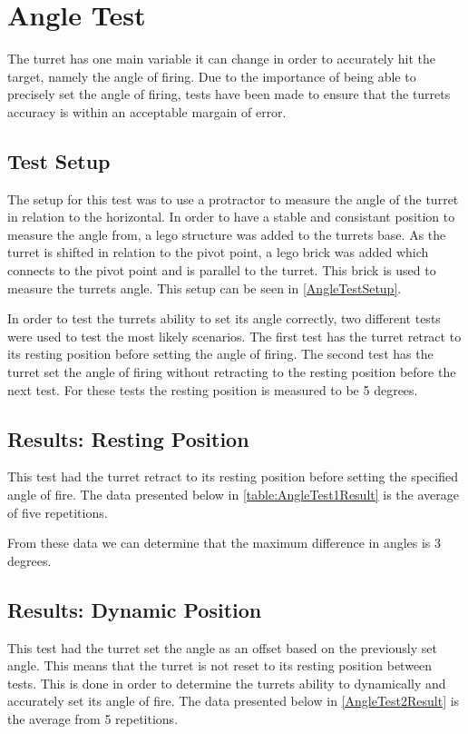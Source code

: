 \chapter{Angle Test}\label{angleTest}
The turret has one main variable it can change in order to accurately hit the
target, namely the angle of firing. Due to the importance of being able to
precisely set the angle of firing, tests have been made to ensure that the
turrets accuracy is within an acceptable margain of error.

\section{Test Setup}
The setup for this test was to use a protractor to measure the angle of the
turret in relation to the horizontal. In order to have a stable and
consistant position to measure the angle from, a lego structure was added to the
turrets base. As the turret is shifted in relation to the pivot point, a lego
brick was added which connects to the pivot point and is parallel to the turret.
This brick is used to measure the turrets angle. This setup can be seen in
\autoref{AngleTestSetup}.


In order to test the turrets ability to set its angle correctly, two different
tests were used to test the most likely scenarios. The first test has the turret
retract to its resting position before setting the angle of firing. The second
test has the turret set the angle of firing without retracting to the resting
position before the next test. For these tests the resting position is measured
to be 5 degrees.

\section{Results: Resting Position}
This test had the turret retract to its resting position before setting the
specified angle of fire. The data presented below in
\autoref{table:AngleTest1Result} is the average of five repetitions.


From these data we can determine that the maximum difference in angles is 3
degrees.  

\section{Results: Dynamic Position}
This test had the turret set the angle as an offset based on the previously set
angle. This means that the turret is not reset to its resting position between
tests. This is done in order to determine the turrets ability to dynamically and
accurately set its angle of fire. The data presented below in
\autoref{AngleTest2Result} is the average from 5 repetitions.

